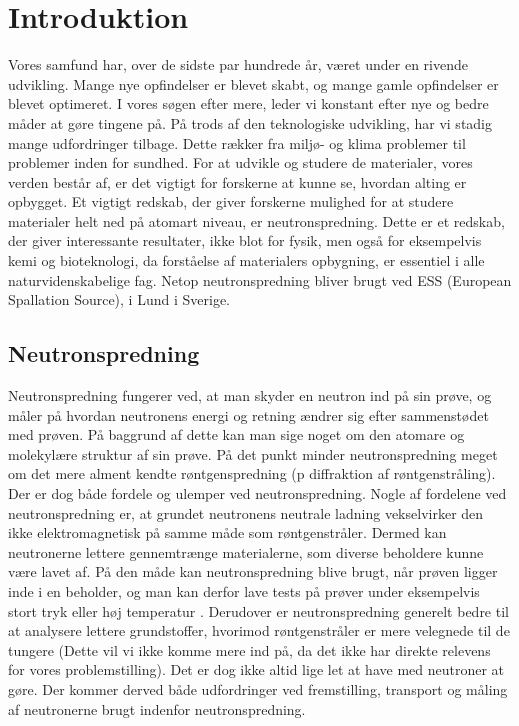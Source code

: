 \documentclass[12pt,oneside,a4paper]{article}
\begin{document}
{{{{{%
\newpage

\tableofcontents

\newpage


\section{Introduktion}

Vores samfund har, over de sidste par hundrede år, været under en rivende udvikling. Mange nye opfindelser er blevet skabt, og mange gamle opfindelser er blevet optimeret. I vores søgen efter mere, leder vi konstant efter nye og bedre måder at gøre tingene på. På trods af den teknologiske udvikling, har vi stadig mange udfordringer tilbage. Dette rækker fra miljø- og klima problemer til problemer inden for sundhed. For at udvikle og studere de materialer, vores verden består af, er det vigtigt for forskerne at kunne se, hvordan alting er opbygget. Et vigtigt redskab, der giver forskerne mulighed for at studere materialer helt ned på atomart niveau, er neutronspredning. Dette er et redskab, der giver interessante resultater, ikke blot for fysik, men også for eksempelvis kemi og bioteknologi, da forståelse af materialers opbygning, er essentiel i alle naturvidenskabelige fag. Netop neutronspredning bliver brugt ved ESS (European Spallation Source), i Lund i Sverige. \cite{ess_folder} \cite{ess_hjemmeside}

\subsection{Neutronspredning}
Neutronspredning fungerer ved, at man skyder en neutron ind på sin prøve, og måler på hvordan neutronens energi og retning ændrer sig efter sammenstødet med prøven. På baggrund af dette kan man sige noget om den atomare og molekylære struktur af sin prøve. På det punkt minder neutronspredning meget om det mere alment kendte røntgenspredning (p diffraktion af røntgenstråling). Der er dog både fordele og ulemper ved neutronspredning. Nogle af fordelene ved neutronspredning er, at grundet neutronens neutrale ladning vekselvirker den ikke elektromagnetisk på samme måde som røntgenstråler. Dermed kan neutronerne lettere gennemtrænge materialerne, som diverse beholdere kunne være lavet af. På den måde kan neutronspredning blive brugt, når prøven ligger inde i en beholder, og man kan derfor lave tests på prøver under eksempelvis stort tryk eller høj temperatur . Derudover er neutronspredning generelt bedre til at analysere lettere grundstoffer, hvorimod røntgenstråler er mere velegnede til de tungere (Dette vil vi ikke komme mere ind på, da det ikke har direkte relevens for vores problemstilling). Det er dog ikke altid lige let at have med neutroner at gøre. Der kommer derved både udfordringer ved fremstilling, transport og måling af neutronerne brugt indenfor neutronspredning.

}}}}}
\end{document}

